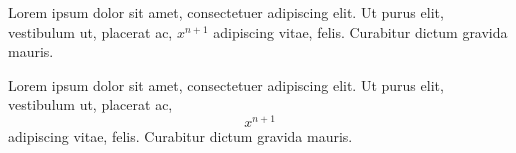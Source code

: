 \documentclass[a4paper,12pt]{article}
\begin{document}

Lorem ipsum dolor sit amet, consectetuer adipiscing elit. Ut purus elit, vestibulum ut, placerat ac, $ x^{n+1} $ adipiscing vitae, felis. Curabitur dictum gravida mauris.

Lorem ipsum dolor sit amet, consectetuer adipiscing elit. Ut purus elit, vestibulum ut, placerat ac, 
\begin{displaymath}
	x^{n+1} 
\end{displaymath}
adipiscing vitae, felis. Curabitur dictum gravida mauris.


% 
% 

% 
% 


% 
% 
% 


% 
% 
% 
\end{document}
